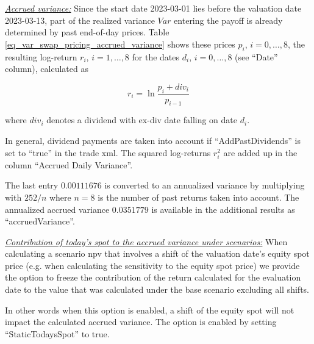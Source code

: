 \underline{\emph{Accrued variance:}} Since the start date 2023-03-01 lies before the valuation date 2023-03-13, part of the
realized variance $Var$ entering the payoff is already determined by past end-of-day prices. Table
\ref{eq_var_swap_pricing_accrued_variance} shows these prices $p_i$, $i=0,\ldots,8$, the resulting log-return $r_i$,
$i=1,\ldots,8$ for the dates $d_i$, $i=0,\ldots,8$ (see ``Date'' column), calculated as

$$r_i = \ln \frac{p_i + div_i}{p_{i-1}}$$

where $div_i$ denotes a dividend with ex-div date falling on date $d_i$.

In general, dividend payments are taken into account if ``AddPastDividends'' is set to ``true'' in the trade xml. The
squared log-returns $r_i^2$ are added up in the column ``Accrued Daily Variance''.

The last entry $0.00111676$ is converted to an annualized variance by multiplying with $252 / n$ where $n=8$ is the
number of past returns taken into account. The annualized accrued variance $0.0351779$ is available in the additional
results as ``accruedVariance''.

\bigskip

\underline{\emph{Contribution of today's spot to the accrued variance under scenarios:}} When calculating a scenario npv
that involves a shift of the valuation date's equity spot price (e.g. when calculating the sensitivity to the equity
spot price) we provide the option to freeze the contribution of the return calculated for the evaluation date to the
value that was calculated under the base scenario excluding all shifts.

In other words when this option is enabled, a shift of the equity spot will not impact the calculated accrued
variance. The option is enabled by setting ``StaticTodaysSpot'' to true.

